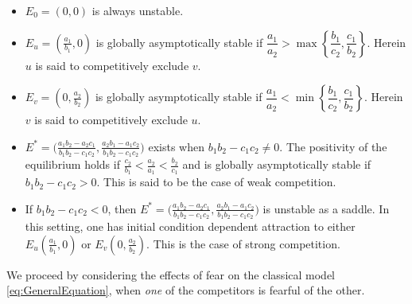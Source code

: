 \documentclass[10pt]{amsart}
\theoremstyle{definition}
\begin{document}
\begin{itemize}
    \item $E_0 = (0,0)$ is always unstable.
    \item $E_u = (\frac{a_1}{b_1},0)$ is globally asymptotically stable if $\dfrac{a_{1}}{a_{2}} > \max\left\lbrace\dfrac{b_{1}}{c_{2}},\dfrac{c_{1}}{b_{2}}\right\rbrace$. Herein $u$ is said to competitively exclude $v$.
    \item $E_v = (0,\frac{a_2}{b_2})$ is globally asymptotically stable if $\dfrac{a_{1}}{a_{2}}<\min\left\lbrace\dfrac{b_{1}}{c_{2}},\dfrac{c_{1}}{b_{2}}\right\rbrace$. Herein $v$ is said to competitively exclude $u$. 
    \item $E^* = \Big(\frac{a_1b_2-a_2c_1}{b_1b_2-c_1c_2},\frac{a_2b_1-a_1c_2}{b_1b_2-c_1c_2}\Big)$ exists when $b_1b_2-c_1c_2 \neq 0$. The positivity of the equilibrium holds if $\frac{c_2}{b_1}<\frac{a_2}{a_1}<\frac{b_2}{c_1}$ and is globally asymptotically stable if $b_1b_2-c_1c_2>0$. This is said to be the case of weak competition.
   
   \item If $b_1b_2-c_1c_2<0$, then $E^* = \Big(\frac{a_1b_2-a_2c_1}{b_1b_2-c_1c_2},\frac{a_2b_1-a_1c_2}{b_1b_2-c_1c_2}\Big)$ is unstable as a saddle. In this setting, one has initial condition dependent attraction to either $E_u(\frac{a_1}{b_1},0)$ or $E_v(0,\frac{a_2}{b_2})$. This is the case of strong competition.
\end{itemize}

%
%
%
%
%
We proceed by considering the effects of fear on the classical model \eqref{eq:GeneralEquation}, when \emph{one} of the competitors is fearful of the other.
\end{document}
